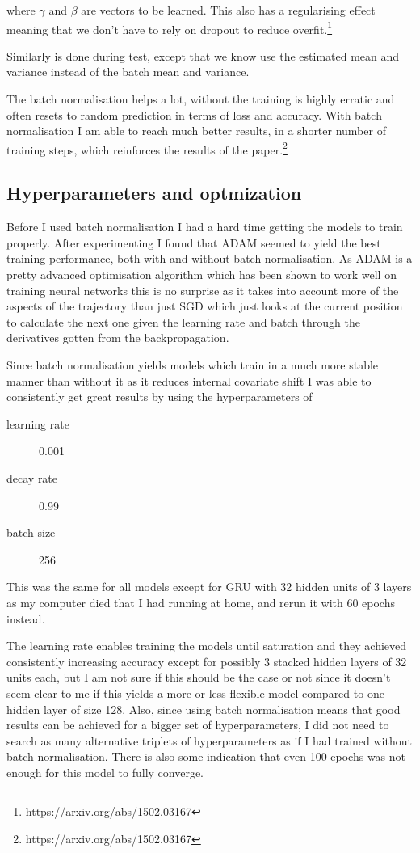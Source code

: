 \documentclass{article}
\begin{document}
where $\gamma$ and $\beta$ are vectors to be learned. This also has a
regularising effect meaning that we don't have to rely on dropout to reduce
overfit.\footnote{https://arxiv.org/abs/1502.03167}

Similarly is done during test, except that we know use the estimated mean and
variance instead of the batch mean and variance.

The batch normalisation helps a lot, without the training is highly erratic and
often resets to random prediction in terms of loss and accuracy. With batch
normalisation I am able to reach much better results, in a shorter number of
training steps, which reinforces the results of the paper.\footnote{https://arxiv.org/abs/1502.03167}

\subsection{Hyperparameters and optmization}

Before I used batch normalisation I had a hard time getting the models to train
properly. After experimenting I found that ADAM seemed to yield the best
training performance, both with and without batch normalisation. As ADAM is a
pretty advanced optimisation algorithm which has been shown to work well on
training neural networks this is no surprise as it takes into account more of
the aspects of the trajectory than just SGD which just looks at the current
position to calculate the next one given the learning rate and batch through the
derivatives gotten from the backpropagation.

Since batch normalisation yields models which train in a much more stable manner
than without it as it reduces internal covariate shift I was able to
consistently get great results by using the hyperparameters of

\begin{description}
\item[learning rate] 0.001
\item[decay rate] 0.99
\item[batch size] 256
\end{description}

This was the same for all models except for GRU with 32 hidden units of 3 layers
as my computer died that I had running at home, and rerun it with 60 epochs instead.

The learning rate enables training the models until saturation and they achieved
consistently increasing accuracy except for possibly 3 stacked hidden layers of
32 units each, but I am not sure if this should be the case or not since it
doesn't seem clear to me if this yields a more or less flexible model compared
to one hidden layer of size 128. Also, since using batch normalisation means
that good results can be achieved for a bigger set of hyperparameters, I did not
need to search as many alternative triplets of hyperparameters as if I had
trained without batch normalisation. There is also some indication that even 100
epochs was not enough for this model to fully converge.
\end{document}
